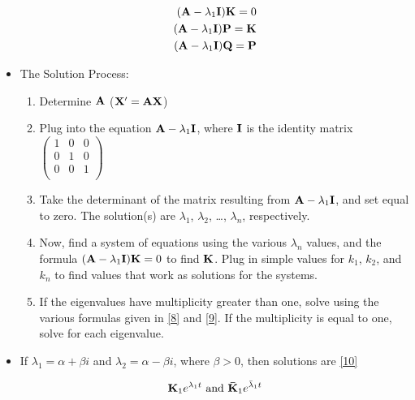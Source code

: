 \documentclass[12pt]{article}
\begin{document}
\begin{itemize}
    \begin{equation}
      \begin{split}
      (\bold{A}-\lambda_1\bold{I})\bold{K}=0\\
      (\bold{A}-\lambda_1\bold{I})\bold{P}=\bold{K}\\
      (\bold{A}-\lambda_1\bold{I})\bold{Q}=\bold{P}\\
    \end{split}
      \label{9}
    \end{equation}

  \item The Solution Process:

    \begin{enumerate}

      \item Determine $\bold{A}$ ($\bold{X}'=\bold{AX}$)

      \item Plug into the equation $\bold{A}-\lambda_1\bold{I}$, where $\bold{I}$ is the identity matrix $\begin{pmatrix} 1 & 0 & 0\\ 0 & 1 & 0 \\ 0 & 0 & 1 \\ \end{pmatrix}$

      \item Take the determinant of the matrix resulting from $\bold{A}-\lambda_1\bold{I}$, and set equal to zero. The solution(s) are $\lambda_1$, $\lambda_2$, \dots, $\lambda_n$, respectively.

      \item Now, find a system of equations using the various $\lambda_n$ values, and the formula $(\bold{A}-\lambda_1\bold{I})\bold{K}=0$ to find $\bold{K}$. Plug in simple values for $k_1$, $k_2$, and $k_n$ to find values that work as solutions for the systems. 

      \item If the eigenvalues have multiplicity greater than one, solve using the various formulas given in \eqref{8} and \eqref{9}. If the multiplicity is equal to one, solve for each eigenvalue. 

    \end{enumerate}

  \item If $\lambda_1=\alpha+\beta i$ and $\lambda_2=\alpha - \beta i$, where $\beta>0$, then solutions are \eqref{10}

    \begin{equation}
      \bold{K}_1e^{\lambda_1 t}\text{ and } \bold{\bar{K}}_1e^{\bar{\lambda}_1 t}
      \label{10}
    \end{equation}


\end{itemize}
\end{document}
